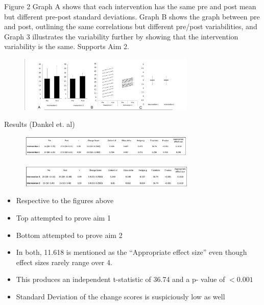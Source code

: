 \documentclass[
  ignorenonframetext,
  aspectratio=169,
]{beamer}
\providecommand{\tightlist}{%
  \setlength{\itemsep}{0pt}\setlength{\parskip}{0pt}}
\begin{document}
\begin{frame}{Figure 2}
\protect\hypertarget{figure-2-1}{}
Graph A shows that each intervention has the same pre and post mean but
different pre-post standard deviations. Graph B shows the graph between
pre and post, outlining the same correlations but different pre/post
variabilities, and Graph 3 illustrates the variability further by
showing that the intervention variability is the same. Supports Aim 2.

\begin{figure}[h]
    \centering
    \includegraphics[width=0.75\textwidth]{fig2.png}
\end{figure}
\end{frame}

\begin{frame}{Results (Dankel et. al)}
\protect\hypertarget{results-dankel-et.-al}{}
\begin{figure}[h]
    \centering
    \includegraphics[width=0.75\textwidth]{figresult1.png}
\end{figure}

\begin{figure}[h]
    \centering
    \includegraphics[width=0.75\textwidth]{figresult2.png}
\end{figure}

\begin{itemize}
\tightlist
\item
  Respective to the figures above
\item
  Top attempted to prove aim 1
\item
  Bottom attempted to prove aim 2
\item
  In both, 11.618 is mentioned as the ``Appropriate effect size'' even
  though effect sizes rarely range over 4.
\item
  This produces an independent t-statistic of 36.74 and a p- value of
  \(< 0.001\)
\item
  Standard Deviation of the change scores is suspiciously low as well
\end{itemize}
\end{frame}
\end{document}
